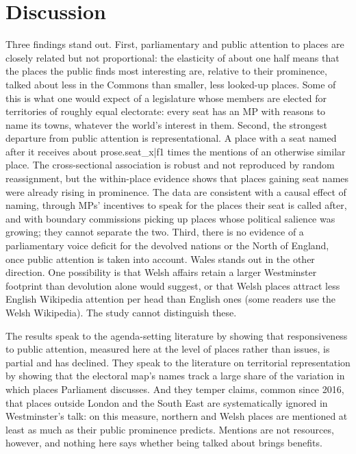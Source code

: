 \documentclass[11pt,a4paper]{article}
\begin{document}
\section{Discussion}
\label{sec:discussion}
Three findings stand out. First, parliamentary and public attention to places are closely related but not proportional: the elasticity of about one half means that the places the public finds most interesting are, relative to their prominence, talked about less in the Commons than smaller, less looked-up places. Some of this is what one would expect of a legislature whose members are elected for territories of roughly equal electorate: every seat has an MP with reasons to name its towns, whatever the world's interest in them. Second, the strongest departure from public attention is representational. A place with a seat named after it receives about {{prose.seat_x|f1}} times the mentions of an otherwise similar place. The cross-sectional association is robust and not reproduced by random reassignment, but the within-place evidence shows that places gaining seat names were already rising in prominence. The data are consistent with a causal effect of naming, through MPs' incentives to speak for the places their seat is called after, and with boundary commissions picking up places whose political salience was growing; they cannot separate the two. Third, there is no evidence of a parliamentary voice deficit for the devolved nations or the North of England, once public attention is taken into account. Wales stands out in the other direction. One possibility is that Welsh affairs retain a larger Westminster footprint than devolution alone would suggest, or that Welsh places attract less English Wikipedia attention per head than English ones (some readers use the Welsh Wikipedia). The study cannot distinguish these.

The results speak to the agenda-setting literature by showing that responsiveness to public attention, measured here at the level of places rather than issues, is partial and has declined. They speak to the literature on territorial representation by showing that the electoral map's names track a large share of the variation in which places Parliament discusses. And they temper claims, common since 2016, that places outside London and the South East are systematically ignored in Westminster's talk: on this measure, northern and Welsh places are mentioned at least as much as their public prominence predicts. Mentions are not resources, however, and nothing here says whether being talked about brings benefits.
\end{document}
